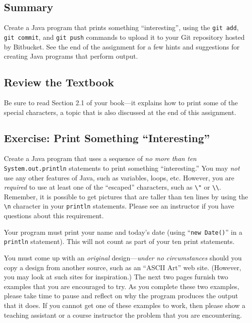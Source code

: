 


\subsection*{Summary}

Create a Java program that prints something ``interesting'', using the {\tt git add}, {\tt git commit}, and {\tt git
  push} commands to upload it to your Git repository hosted by Bitbucket.  See the end of the assignment for a few hints
and suggestions for creating Java programs that perform output.

\subsection*{Review the Textbook}

Be sure to read Section 2.1 of your book---it explains how to print some of the special characters, a topic that is also
discussed at the end of this assignment.

\subsection*{Exercise: Print Something ``Interesting''}

Create a Java program that uses a sequence of {\em no more than ten} {\tt System.out.println} statements to print
something ``interesting.'' You may {\em not} use any other features of Java, such as variables, loops, etc.  However,
you are {\em required} to use at least one of the ``escaped'' characters, such as \verb$\"$ or \verb$\\$.  Remember, it
is possible to get pictures that are taller than ten lines by using the \verb$\n$ character in your {\tt println}
statements. Please see an instructor if you have questions about this requirement.

Your program must print your name and today's date (using ``{\tt new Date()}'' in a {\tt println} statement).  This will
not count as part of your ten print statements.

You must come up with an {\em original} design---{\em under no circumstances} should you copy a design from another
source, such as an ``ASCII Art'' web site. (However, you may look at such sites for inspiration.) The next two pages
furnish two examples that you are encouraged to try. As you complete these two examples, please take time to pause and
reflect on why the program produces the output that it does.  If you cannot get one of these examples to work, then
please show a teaching assistant or a course instructor the problem that you are encountering.

